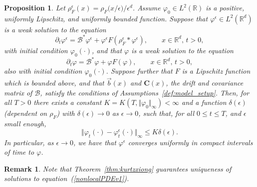 \documentclass[12pt]{article}
\newtheorem{proposition}[theorem]{Proposition}
\newtheorem{remark}[theorem]{Remark}
\newcommand{\IR}{\mathbb R}
\newcommand{\DG}{\mathcal{B}}  %
\newcommand{\meanq}{\vec b}    %
\newcommand{\covq}{\mathbf{C}}     %
\numberwithin{equation}{section}
\begin{document}
\begin{proposition}
    \label{prop:nonlocal_to_local}
Let $\rho^\epsilon_F(x)=\rho_F\big(x/\epsilon)/\epsilon^d$.
Assume $\varphi_0\in L^2(\IR)$ is a positive, uniformly Lipschitz, and uniformly bounded function. 
Suppose that $\varphi^\epsilon\in L^2(\IR^d)$ is a weak solution to the equation
\begin{equation}
\label{nonlocalPDEv1} 
\partial_t \varphi^\epsilon = \DG^* \varphi^\epsilon + 
\varphi^\epsilon F(\rho_F^\epsilon*\varphi^\epsilon),  
\qquad x \in \mathbb{R}^d,\, t >0, %
\end{equation}
with initial condition $\varphi_0(\cdot)$,
and that $\varphi$ is a weak solution to the equation
 \begin{equation}
\label{localPDE} 
\partial_t \varphi = \DG^* \varphi + \varphi F(\varphi),  
\qquad x \in \mathbb{R}^d,\, t >0, %
\end{equation}
also with initial condition $\varphi_0(\cdot)$.
Suppose further that $F$ is a Lipschitz function which is bounded above, and that
$\meanq(x)$ and $\covq(x)$, the drift and 
covariance matrix of $\DG$, satisfy the conditions of 
Assumptions~\ref{def:model_setup}.
Then, for all $T>0$ there exists a constant $K=K(T, \Vert \varphi_0 \Vert_\infty) < \infty$
and a function $\delta(\epsilon)$ (dependent on $\rho_F$) with $\delta(\epsilon)\to 0$ 
as $\epsilon\to 0$,
such that, for all $0 \leq t \leq T$, and $\epsilon$ small enough,
\[ 
\Vert \varphi_t(\cdot) - \varphi_t^\epsilon(\cdot) \Vert_\infty\leq K\delta(\epsilon). 
\]
In particular, as $\epsilon\to 0$, we have that $\varphi^\epsilon$ converges 
uniformly in compact intervals of time to $\varphi$.
\end{proposition}

\begin{remark}
Note that Theorem~\ref{thm:kurtzxiong} guarantees uniqueness of solutions
to equation~(\ref{nonlocalPDEv1}). 
\end{remark}
\end{document}
